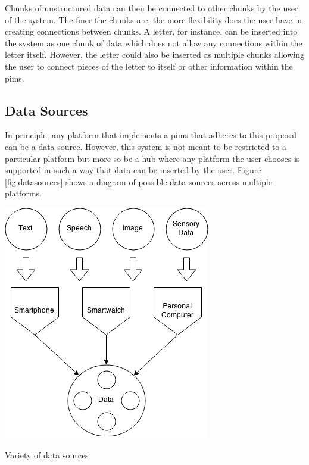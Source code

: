Chunks of unstructured data can then be connected to other chunks by the user of
the system. The finer the chunks are, the more flexibility does the user have in
creating connections between chunks. A letter, for instance, can be inserted
into the system as one chunk of data which does not allow any connections within
the letter itself. However, the letter could also be inserted as multiple chunks
allowing the user to connect pieces of the letter to itself or other
information within the \gls{pims}.

\subsection{Data Sources}

In principle, any platform that implements a \gls{pims} that adheres to this
proposal can be a data source. However, this system is not meant to be
restricted to a particular platform but more so be a hub where any platform the
user chooses is supported in such a way that data can be inserted by the user.
Figure \ref{fig:datasources} shows a diagram of possible data sources across
multiple platforms.

\begin{flfigure}
  \centering
    \includegraphics[width=0.9\linewidth]{00_resources/input_methods.png}
    \caption{Variety of data sources}
  \label{fig:datasources}
\end{flfigure}

